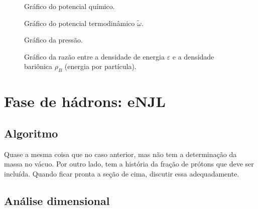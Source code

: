 \begin{enumerate}
\begin{figure}
	
	\caption{Gráfico do potencial químico. \protect}
	\label{Fig:chemical_potential_NJL-D_1}
\end{figure}

\begin{figure}
	
	\caption{Gráfico do potencial termodinâmico $\tilde{\omega}$. \protect}
	\label{Fig:thermodynamic_potential_NJL-D_1}
\end{figure}

\begin{figure}
	
	\caption{Gráfico da pressão. \protect}
	\label{Fig:pressure_NJL-D_1}
\end{figure}

\begin{figure}
	
	\caption{Gráfico da razão entre a densidade de energia $\varepsilon$ e a densidade bariônica $\rho_B$ (energia por partícula). \protect}
	\label{Fig:energy_density_per_particle_NJL-D_1}
\end{figure}

\FloatBarrier


\section{Fase de hádrons: eNJL}

\subsection{Algoritmo}

Quase a mesma coisa que no caso anterior, mas não tem a determinação da massa no vácuo. Por outro lado, tem a história da fração de prótons que deve ser incluída. Quando ficar pronta a seção de cima, discutir essa adequadamente.

\subsection{Análise dimensional}


\end{enumerate}
